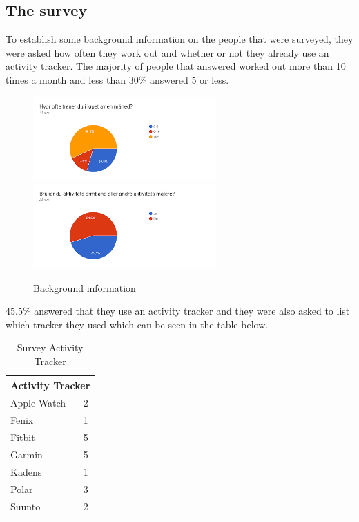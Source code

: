 \subsection{The survey}
To establish some background information on the people that were surveyed, they were asked how often they work out and whether or not they already use an activity tracker. The majority of people that answered worked out more than 10 times a month and less than 30\% answered 5 or less.
\begin{figure}[H]%
    \centering
    {{\includegraphics[width=7cm]{figures/testings.png} }}%
    \qquad
     {{\includegraphics[width=7cm]{figures/survey2.png} }}%
    \caption{Background information}%
\end{figure}
45.5\% answered that they use an activity tracker and they were also asked to list which tracker they used which can be seen in the table below. 

\begin{table}[H]
\centering
\begin{tabular}{ |l|l| }
  \hline
  \multicolumn{2}{|c|}{Activity Tracker} \\
  \hline
Apple Watch & 2\\ 
\hline
Fenix & 1\\
\hline
Fitbit & 5\\ 
  \hline
  Garmin & 5 \\ 
  \hline
  Kadens & 1\\ 
  \hline
   Polar & 3\\ 
  \hline
   Suunto & 2\\ 
  \hline
\end{tabular}
\label{tab:3}
\caption{Survey Activity Tracker}
\end{table}


